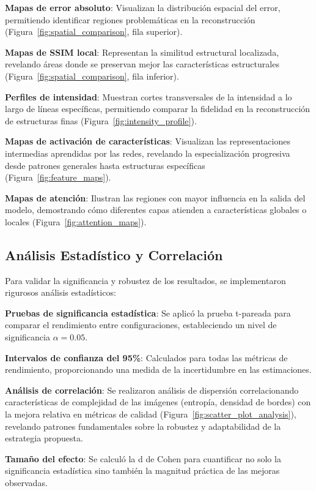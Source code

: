 \textbf{Mapas de error absoluto}: Visualizan la distribución espacial del error, permitiendo identificar regiones problemáticas en la reconstrucción (Figura~\ref{fig:spatial_comparison}, fila superior).

\textbf{Mapas de SSIM local}: Representan la similitud estructural localizada, revelando áreas donde se preservan mejor las características estructurales (Figura~\ref{fig:spatial_comparison}, fila inferior).

\textbf{Perfiles de intensidad}: Muestran cortes transversales de la intensidad a lo largo de líneas específicas, permitiendo comparar la fidelidad en la reconstrucción de estructuras finas (Figura~\ref{fig:intensity_profile}).

\textbf{Mapas de activación de características}: Visualizan las representaciones intermedias aprendidas por las redes, revelando la especialización progresiva desde patrones generales hasta estructuras específicas (Figura~\ref{fig:feature_maps}).

\textbf{Mapas de atención}: Ilustran las regiones con mayor influencia en la salida del modelo, demostrando cómo diferentes capas atienden a características globales o locales (Figura~\ref{fig:attention_maps}).

\subsection{Análisis Estadístico y Correlación}

Para validar la significancia y robustez de los resultados, se implementaron rigurosos análisis estadísticos:

\textbf{Pruebas de significancia estadística}: Se aplicó la prueba t-pareada para comparar el rendimiento entre configuraciones, estableciendo un nivel de significancia $\alpha = 0.05$.

\textbf{Intervalos de confianza del 95\%}: Calculados para todas las métricas de rendimiento, proporcionando una medida de la incertidumbre en las estimaciones.

\textbf{Análisis de correlación}: Se realizaron análisis de dispersión correlacionando características de complejidad de las imágenes (entropía, densidad de bordes) con la mejora relativa en métricas de calidad (Figura~\ref{fig:scatter_plot_analysis}), revelando patrones fundamentales sobre la robustez y adaptabilidad de la estrategia propuesta.

\textbf{Tamaño del efecto}: Se calculó la d de Cohen para cuantificar no solo la significancia estadística sino también la magnitud práctica de las mejoras observadas.

